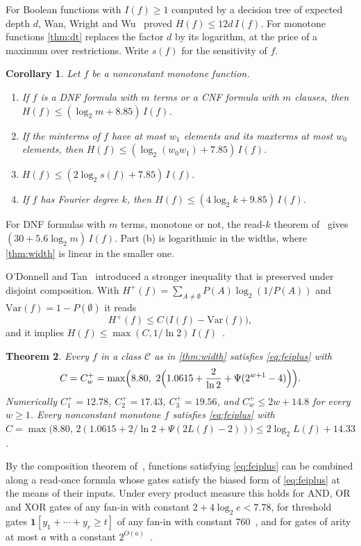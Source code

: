 \documentclass[11pt]{amsart}
\newtheorem{theorem}{Theorem}[section]
\newtheorem{corollary}[theorem]{Corollary}
\theoremstyle{remark}
\newcommand{\Var}{\mathrm{Var}}
\begin{document}
For Boolean functions with $I(f)\ge1$ computed by a decision tree of expected depth $d$, Wan, Wright and
Wu~\cite{WWW14} proved $H(f)\le12d\,I(f)$. For monotone functions \cref{thm:dt} replaces the factor $d$ by its
logarithm, at the price of a maximum over restrictions. Write $s(f)$ for the sensitivity of $f$.

\begin{corollary}\label{cor:dtcases}
Let $f$ be a nonconstant monotone function.
\begin{enumerate}
\item[(a)] If $f$ is a DNF formula with $m$ terms or a CNF formula with $m$ clauses, then
$H(f)\le(\log_2m+8.85)\,I(f)$.
\item[(b)] If the minterms of $f$ have at most $w_1$ elements and its maxterms at most $w_0$ elements, then
$H(f)\le(\log_2(w_0w_1)+7.85)\,I(f)$.
\item[(c)] $H(f)\le(2\log_2s(f)+7.85)\,I(f)$.
\item[(d)] If $f$ has Fourier degree $k$, then $H(f)\le(4\log_2k+9.85)\,I(f)$.
\end{enumerate}
\end{corollary}

For DNF formulas with $m$ terms, monotone or not, the read-$k$ theorem of~\cite{Shm26} gives
$(30+5.6\log_2m)\,I(f)$. Part (b) is logarithmic in the widths, where \cref{thm:width} is linear in the smaller one.

O'Donnell and Tan~\cite{OT13} introduced a stronger inequality that is preserved under disjoint composition. With
$H^+(f)=\sum_{A\neq\emptyset}P(A)\log_2(1/P(A))$ and $\Var(f)=1-P(\emptyset)$ it reads
\begin{equation}\label{eq:feiplus}
H^+(f)\le C\,\bigl(I(f)-\Var(f)\bigr),
\end{equation}
and it implies $H(f)\le\max(C,1/\ln2)\,I(f)$~\cite[Proposition~2.1]{OT13}.

\begin{theorem}\label{thm:plus}
Every $f$ in a class $\mathcal C$ as in \cref{thm:width} satisfies \eqref{eq:feiplus} with
\[
C=C^+_w=\max\Bigl(8.80,\ 2\Bigl(1.0615+\frac2{\ln2}+\Psi(2^{w+1}-4)\Bigr)\Bigr).
\]
Numerically $C^+_1=12.78$, $C^+_2=17.43$, $C^+_3=19.56$, and $C^+_w\le2w+14.8$ for every $w\ge1$. Every nonconstant
monotone $f$ satisfies \eqref{eq:feiplus} with
$C=\max\bigl(8.80,\,2(1.0615+2/\ln2+\Psi(2L(f)-2))\bigr)\le2\log_2L(f)+14.33$.
\end{theorem}

By the composition theorem of~\cite{OT13}, functions satisfying \eqref{eq:feiplus} can be combined along a read-once
formula whose gates satisfy the biased form of \eqref{eq:feiplus} at the means of their inputs. Under every product
measure this holds for AND, OR and XOR gates of any fan-in with constant $2+4\log_2e<7.78$, for threshold gates
$\mathbf 1[y_1+\cdots+y_r\ge t]$ of any fan-in with constant $760$~\cite{Shm26}, and for gates of arity at most $a$
with a constant $2^{O(a)}$~\cite{OT13}.
\end{document}
